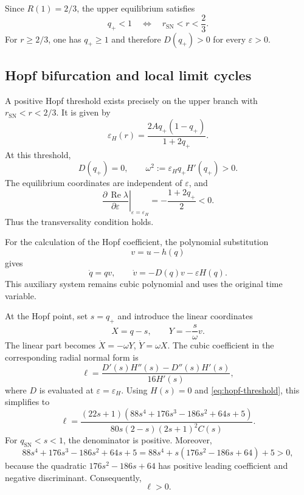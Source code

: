 \documentclass[11pt,reqno]{amsart}
\theoremstyle{plain}
\theoremstyle{definition}
\theoremstyle{remark}
\begin{document}
Since $R(1)=2/3$, the upper equilibrium satisfies
\[
q_+<1
\quad\Longleftrightarrow\quad
r_{\mathrm{SN}}<r<\frac23.
\]
For $r\geq2/3$, one has $q_+\geq1$ and therefore
$D(q_+)>0$ for every $\varepsilon>0$.


\subsection{Hopf bifurcation and local limit cycles}
\label{subsec:hopf}

A positive Hopf threshold exists precisely on the upper branch
with $r_{\mathrm{SN}}<r<2/3$. It is given by
\begin{equation}
\varepsilon_H(r)
=
\frac{2Aq_+(1-q_+)}{1+2q_+}.
\label{eq:hopf-threshold}
\end{equation}
At this threshold,
\[
D(q_+)=0,
\qquad
\omega^2:=\varepsilon_Hq_+H'(q_+)>0.
\]
The equilibrium coordinates are independent of $\varepsilon$,
and
\begin{equation}
\left.
\frac{\partial\,\operatorname{Re}\lambda}
{\partial\varepsilon}
\right|_{\varepsilon=\varepsilon_H}
=-\frac{1+2q_+}{2}<0.
\label{eq:hopf-transversality}
\end{equation}
Thus the transversality condition holds.

For the calculation of the Hopf coefficient, the polynomial
substitution
\[
v=u-h(q)
\]
gives
\begin{equation}
\dot q=qv,
\qquad
\dot v=-D(q)v-\varepsilon H(q).
\label{eq:polynomial-auxiliary}
\end{equation}
This auxiliary system remains cubic polynomial and uses
the original time variable.

At the Hopf point, set $s=q_+$ and introduce the linear
coordinates
\[
X=q-s,\qquad Y=-\frac{s}{\omega}v.
\]
The linear part becomes
$\dot X=-\omega Y$, $\dot Y=\omega X$.
The cubic coefficient in the corresponding radial normal
form is
\begin{equation}
\ell=
\frac{D'(s)H''(s)-D''(s)H'(s)}
{16H'(s)},
\label{eq:hopf-coefficient-derivatives}
\end{equation}
where $D$ is evaluated at $\varepsilon=\varepsilon_H$.
Using $H(s)=0$ and \eqref{eq:hopf-threshold}, this simplifies to
\begin{equation}
\ell=
\frac{
(22s+1)
\left(88s^4+176s^3-186s^2+64s+5\right)
}{
80s(2-s)(2s+1)^2C(s)
}.
\label{eq:hopf-coefficient}
\end{equation}
For $q_{\mathrm{SN}}<s<1$, the denominator is positive.
Moreover,
\[
88s^4+176s^3-186s^2+64s+5
=
88s^4+s(176s^2-186s+64)+5>0,
\]
because the quadratic $176s^2-186s+64$ has positive
leading coefficient and negative discriminant.
Consequently,
\begin{equation}
\ell>0.
\label{eq:hopf-positive}
\end{equation}
\end{document}
